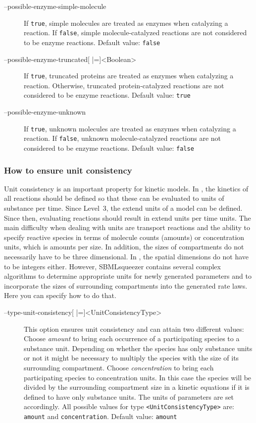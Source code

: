\begin{description}
\item[--possible-enzyme-simple-molecule]
  If \texttt{true}, simple molecules are treated as enzymes when catalyzing
  a reaction. If \texttt{false}, simple molecule-catalyzed reactions
  are not considered to be enzyme reactions.
  Default value: \texttt{false}

\item[--possible-enzyme-truncated{[} |={]}<Boolean>]
  If \texttt{true}, truncated proteins are treated as enzymes
  when catalyzing a reaction. Otherwise, truncated protein-catalyzed
  reactions are not considered to be enzyme reactions.
  Default value: \texttt{true}

\item[--possible-enzyme-unknown]
  If \texttt{true}, unknown molecules are treated as enzymes when catalyzing
  a reaction. If \texttt{false}, unknown molecule-catalyzed reactions
  are not considered to be enzyme reactions.
  Default value: \texttt{false}
\end{description}

\subsubsection{How to ensure unit consistency}

Unit consistency is an important property for kinetic models. In \SBML, the
kinetics of all reactions should be defined so that these can be evaluated to
units of substance per time. Since Level~3, the extend units of a model can be
defined. Since then, evaluating reactions should result in extend units per time
units. The main difficulty when dealing with units are transport reactions and
the ability to specify reactive species in terms of molecule counts (amounts) or
concentration units, which is amounts per size. In addition, the sizes of
compartments do not necessarily have to be three dimensional. In \SBML, the
spatial dimensions do not have to be integers either. However, SBMLsqueezer
contains several complex algorithms to determine appropriate units for newly
generated parameters and to incorporate the sizes of surrounding compartments
into the generated rate laws. Here you can specify how to do that.  
\begin{description}
\item[--type-unit-consistency{[} |={]}<UnitConsistencyType>]
  This option ensures unit consistency and can attain two different
  values: Choose \emph{amount} to bring each occurrence of a participating
  species to a substance unit. Depending on whether the species
  has only substance units or not it might be necessary to multiply
  the species with the size of its surrounding compartment. Choose
  \emph{concentration} to bring each participating species to concentration
  units. In this case the species will be divided by the surrounding
  compartment size in a kinetic equations if it is defined to
  have only substance units. The units of parameters are set accordingly.
  All possible values for type \texttt{<UnitConsistencyType>} are:
  \texttt{amount} and \texttt{concentration}.
  Default value: \texttt{amount}
\end{description}

